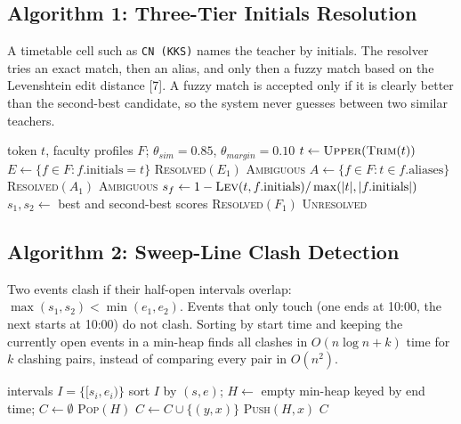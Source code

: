 \subsection{Algorithm 1: Three-Tier Initials Resolution}
A timetable cell such as \texttt{CN (KKS)} names the teacher by initials. The resolver tries an exact match, then an alias, and only then a fuzzy match based on the Levenshtein edit distance [7]. A fuzzy match is accepted only if it is clearly better than the second-best candidate, so the system never guesses between two similar teachers.
\begin{algorithm}[H]
\caption{Three-tier initials resolution (infrastructure/parsers/initials\_resolver.py)}
\begin{algorithmic}[1]
\Require token $t$, faculty profiles $F$; $\theta_{sim}=0.85$, $\theta_{margin}=0.10$
\State $t \gets \textsc{Upper}(\textsc{Trim}(t))$
\State $E \gets \{f \in F : f.\text{initials} = t\}$ 
 \Return \textsc{Resolved}$(E_1)$  \Return \textsc{Ambiguous} \EndIf
\State $A \gets \{f \in F : t \in f.\text{aliases}\}$ 
 \Return \textsc{Resolved}$(A_1)$  \Return \textsc{Ambiguous} \EndIf
{} 
  \State $s_f \gets 1 - \textsc{Lev}(t, f.\text{initials}) / \max(|t|, |f.\text{initials}|)$
\EndFor
\State $s_1, s_2 \gets$ best and second-best scores
 \Return \textsc{Resolved}$(F_1)$ \EndIf
\State \Return \textsc{Unresolved} 
\end{algorithmic}
\end{algorithm}

\subsection{Algorithm 2: Sweep-Line Clash Detection}
Two events clash if their half-open intervals overlap: $\max(s_1, s_2) < \min(e_1, e_2)$. Events that only touch (one ends at 10:00, the next starts at 10:00) do not clash. Sorting by start time and keeping the currently open events in a min-heap finds all clashes in $O(n \log n + k)$ time for $k$ clashing pairs, instead of comparing every pair in $O(n^2)$.
\begin{algorithm}[H]
\caption{Sweep-line clash detection (application/calendar/clash\_detector.py)}
\begin{algorithmic}[1]
\Require intervals $I = \{[s_i, e_i)\}$
\State sort $I$ by $(s, e)$; $H \gets$ empty min-heap keyed by end time; $C \gets \emptyset$
   \State \textsc{Pop}$(H)$ \EndWhile
   \State $C \gets C \cup \{(y, x)\}$ \EndFor
  \State \textsc{Push}$(H, x)$
\EndFor
\State \Return $C$
\end{algorithmic}
\end{algorithm}

